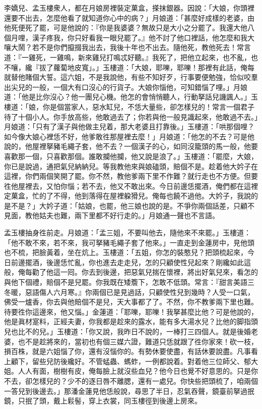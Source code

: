 李嬌兒、孟玉樓衆人，都在月娘房裡裝定菓盒，搽抹銀器。因說：「大娘，你頭裡還要不出去，怎麼他看了就知道你心中的病？」月娘道：「甚麼好成樣的老婆，由他死便死了罷，可是他說的：『你是我婆婆？無故只是大小之分罷了。我還大他八個月哩，漢子疼我，你只好看我一眼兒罷了。』他不討了他口裡話，他怎麼和我大嚷大鬧？{}若不是你們攛掇我出去，我後十年也不出去。隨他死，教他死去！常言道：『一雞死，一雞鳴，新來雞兒打鳴忒好聽。』{}我死了，把他立起來，也不亂，也不嚷，纔『拔了蘿蔔地皮寬」。」玉樓道：「大娘，耶嚛，耶嚛！那裡有此話，俺每就替他賭個大誓。這六姐，不是我說他，有些不知好歹，行事要便勉強，恰似咬羣出尖兒的一般，一個大有口沒心的行貨子。{}大娘你惱他，可知錯惱了哩。」{}月娘道：「他是比你沒心？他一團兒心機。他怎的會悄悄聽人，行動拏話兒譏諷人。」玉樓道：「娘，你是個當家人，惡水缸兒，不恁大量些，卻怎樣兒的！常言一個君子待了十個小人。{}你手放高些，他敢過去了；你若與他一般見識起來，他敢過不去。」月娘道：「只有了漢子與他做主兒着，那大老婆且打靠後。」玉樓道：「哄那個哩？如今像大娘心裡恁不好，他爹敢徃那屋裡去麼！」月娘道：「他怎的不去？可是他說的，他屋裡拏豬毛繩子套，他不去？一個漢子的心，如同沒籠頭的馬一般，他要喜歡那一個，只喜歡那個。誰敢攔他攔，他又說是浪了。」{}玉樓道：「罷麼，大娘，你已是說過，通把氣兒納納兒。等我教他來與娘磕頭，賠個不是。趁着他大妗子在這裡，你們兩個笑開了罷。你不然，教他爹兩下里不作難？就行走也不方便。但要徃他屋裡去，又怕你惱；若不去，他又不敢出來。今日前邊恁擺酒，俺們都在這裡定菓盒，忙的了不得，他到落得在屋裡躱猾兒。俺每也饒不過他。大妗子，我說的是不是？」大妗子道：「姑娘，也罷，他三娘也說的是。不爭你兩個話差，只顧不見面，教他姑夫也難，兩下里都不好行走的。」月娘通一聲也不言語。

孟玉樓抽身徃前走。{}月娘道：「孟三姐，不要叫他去，隨他來不來罷。」玉樓道：「他不敢不來，若不來，我可拏豬毛繩子套了他來。」{}{}一直走到金蓮房中，見他頭也不梳，把臉黃着，坐在炕上。玉樓道：「五姐，你怎的裝憨兒？把頭梳起來，今日前邊擺酒，後邊恁忙亂，你也進去走走兒，怎的只顧使性兒起來？剛纔如此這般，俺每勸了他這一囘。你去到後邊，把惡氣兒揣在懷裡，將出好氣兒來，看怎的與他下個禮，賠個不是兒罷。你我既在矮簷下，怎敢不低頭。常言：『甜言美語三冬暖，惡語傷人六月寒。』你兩個已是見過話，只顧使性兒到幾時？人受一口氣，佛受一爐香，你去與他賠個不是兒，天大事都了了。不然，你不教爹兩下里也難。待要徃你這邊來，他又惱。」{}金蓮道：「耶嚛，耶嚛！我拏甚麼比他？{}可是他說的，他是眞材寔料，正經夫妻，你我都是趁來的露水，能有多大湯水兒？比他的脚指頭兒也比不的兒。」玉樓道：「你又說，我昨日不說的，一棒打三四個人。就是後婚老婆，也不是趁將來的，當初也有個三媒六證，難道只恁就跟了徃你家來！砍一枝，損百株，就是六姐惱了你，還有沒惱你的。有勢休要使盡，有話休要說盡。凡事看上顧下，留些兒防後纔好。不管蜢蟲、螞蚱，一例都說着。對着他三位師父、郁大姐。人人有面，樹樹有皮，俺每臉上就沒些血兒？他今日也覺不好意思的。只是你不去，卻怎樣兒的？少不的逐日唇不離腮，還有一處兒。你快些把頭梳了，咱兩個一答兒到後邊去。」那潘金蓮見他恁般說，尋思了半日，忍氣吞聲，{}鏡臺前拏過抿鏡，只抿了頭，戴上鬏髻，穿上衣裳，同玉樓徑到後邊上房來。

